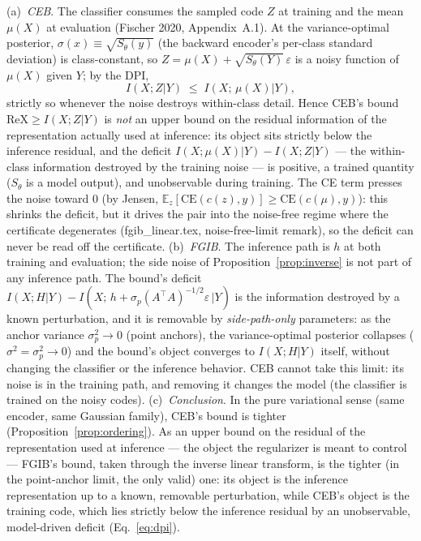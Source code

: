 \begin{proposition}\label{prop:object}
(a)~\emph{CEB}. The classifier consumes the sampled code $Z$ at training and the mean
$\mu(X)$ at evaluation (Fischer 2020, Appendix~A.1). At the variance-optimal posterior,
$\sigma(x) \equiv \sqrt{S_\theta(y)}$ (the backward encoder's per-class standard
deviation) is class-constant, so $Z = \mu(X) + \sqrt{S_\theta(Y)}\,\varepsilon$ is a
noisy function of $\mu(X)$ given $Y$; by the DPI,
\begin{equation}
I(X; Z | Y) \;\le\; I(X;\, \mu(X) | Y) ,
\label{eq:dpi}
\end{equation}
strictly so whenever the noise destroys within-class detail. Hence CEB's bound
$\mathrm{ReX} \ge I(X;Z|Y)$ is \emph{not} an upper bound on the residual information of
the representation actually used at inference: its object sits strictly below the
inference residual, and the deficit $I(X;\mu(X)|Y) - I(X;Z|Y)$ --- the within-class
information destroyed by the training noise --- is positive, a trained quantity
($S_\theta$ is a model output), and unobservable during training. The CE term presses the
noise toward $0$ (by Jensen,
$\mathbb{E}_z[\mathrm{CE}(c(z),y)] \ge \mathrm{CE}(c(\mu),y)$): this shrinks the
deficit, but it drives the pair into the noise-free regime where the certificate
degenerates (fgib\_linear.tex, noise-free-limit remark), so the deficit can never be read
off the certificate.
(b)~\emph{FGIB}. The inference path is $h$ at both training and evaluation; the side
noise of Proposition~\ref{prop:inverse} is not part of any inference path. The bound's
deficit $I(X;H|Y) - I(X;\,h+\sigma_p(A^{\top}A)^{-1/2}\varepsilon\,|Y)$ is the
information destroyed by a known perturbation, and it is removable by
\emph{side-path-only} parameters:
as the anchor variance $\sigma_p^2 \to 0$ (point anchors), the variance-optimal posterior
collapses ($\sigma^2 = \sigma_p^2 \to 0$) and the bound's object converges to
$I(X;H|Y)$ itself, without changing the classifier or the inference behavior.
CEB cannot take this limit: its noise is in the training path, and removing it changes
the model (the classifier is trained on the noisy codes).
(c)~\emph{Conclusion}. In the pure variational sense (same encoder, same Gaussian
family), CEB's bound is tighter (Proposition~\ref{prop:ordering}). As an upper bound on
the residual of the representation used at inference --- the object the regularizer is
meant to control --- FGIB's bound, taken through the inverse linear transform, is the
tighter (in the point-anchor limit, the only valid) one: its object is the inference
representation up to a known, removable perturbation, while CEB's object is the training
code, which lies strictly below the inference residual by an unobservable, model-driven
deficit (Eq.~\eqref{eq:dpi}).
\end{proposition}

